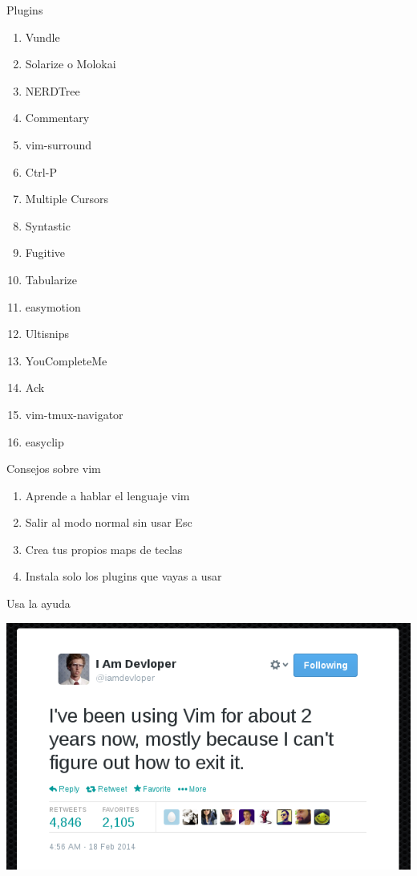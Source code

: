 \documentclass{beamer}
\begin{document}
\begin{frame}{Plugins}
  \begin{enumerate}
  \item Vundle
  \item Solarize o Molokai
  \item NERDTree
  \item Commentary
  \item vim-surround
  \item Ctrl-P
  \item Multiple Cursors
  \item Syntastic
  \item Fugitive
  \item Tabularize
  \item easymotion
  \item Ultisnips
  \item YouCompleteMe
  \item Ack
  \item vim-tmux-navigator
  \item easyclip
  \end{enumerate}
\end{frame}

\begin{frame}{Consejos sobre vim}
  \begin{enumerate}
  \item Aprende a hablar el lenguaje vim
  \item Salir al modo normal sin usar Esc
  \item Crea tus propios maps de teclas
  \item Instala solo los plugins que vayas a usar
  \end{enumerate}
\end{frame}
\begin{frame}{Usa la ayuda}
    \begin{center}
    \includegraphics[width=\paperwidth]{usehelp}
    \end{center}
\end{frame}
\end{document}
